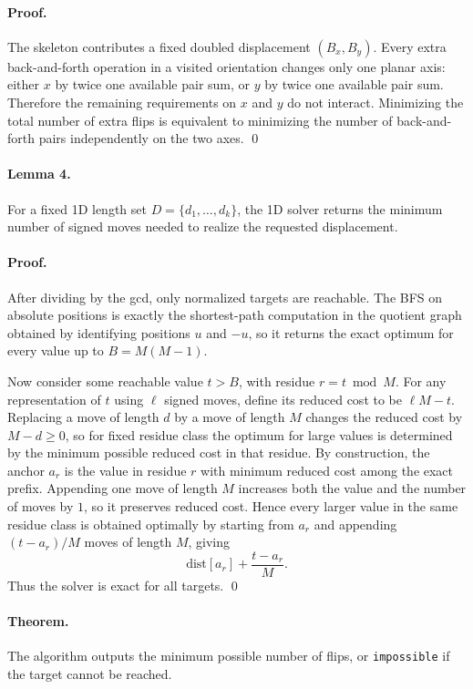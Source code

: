 \documentclass[11pt]{article}
\begin{document}
\paragraph{Proof.}
The skeleton contributes a fixed doubled displacement $(B_x,B_y)$. Every extra back-and-forth operation in a visited orientation changes only one planar axis: either $x$ by twice one available pair sum, or $y$ by twice one available pair sum. Therefore the remaining requirements on $x$ and $y$ do not interact. Minimizing the total number of extra flips is equivalent to minimizing the number of back-and-forth pairs independently on the two axes. \qed

\paragraph{Lemma 4.}
For a fixed 1D length set $D=\{d_1,\dots,d_k\}$, the 1D solver returns the minimum number of signed moves needed to realize the requested displacement.

\paragraph{Proof.}
After dividing by the gcd, only normalized targets are reachable. The BFS on absolute positions is exactly the shortest-path computation in the quotient graph obtained by identifying positions $u$ and $-u$, so it returns the exact optimum for every value up to $B=M(M-1)$.

Now consider some reachable value $t>B$, with residue $r=t\bmod M$. For any representation of $t$ using $\ell$ signed moves, define its reduced cost to be $\ell M - t$. Replacing a move of length $d$ by a move of length $M$ changes the reduced cost by $M-d\ge 0$, so for fixed residue class the optimum for large values is determined by the minimum possible reduced cost in that residue. By construction, the anchor $a_r$ is the value in residue $r$ with minimum reduced cost among the exact prefix. Appending one move of length $M$ increases both the value and the number of moves by $1$, so it preserves reduced cost. Hence every larger value in the same residue class is obtained optimally by starting from $a_r$ and appending $(t-a_r)/M$ moves of length $M$, giving
\[
\text{dist}[a_r] + \frac{t-a_r}{M}.
\]
Thus the solver is exact for all targets. \qed

\paragraph{Theorem.}
The algorithm outputs the minimum possible number of flips, or \texttt{impossible} if the target cannot be reached.
\end{document}
